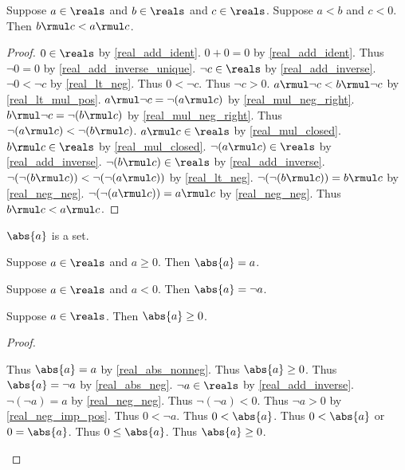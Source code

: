 \begin{theorem}\label{real_lt_mul_neg}
    Suppose $a\in\reals$ and $b\in\reals$ and $c\in\reals$.
    Suppose $a < b$ and $c < 0$.
    Then $b \rmul c < a \rmul c$.
\end{theorem}
\begin{proof}
    $0\in\reals$ by \cref{real_add_ident}.
    $0 + 0 = 0$ by \cref{real_add_ident}.
    Thus $\neg{0} = 0$ by \cref{real_add_inverse_unique}.
    $\neg{c}\in\reals$ by \cref{real_add_inverse}.
    $\neg{0} < \neg{c}$ by \cref{real_lt_neg}.
    Thus $0 < \neg{c}$.
    Thus $\neg{c} > 0$.
    $a \rmul \neg{c} < b \rmul \neg{c}$ by \cref{real_lt_mul_pos}.
    $a \rmul \neg{c} = \neg{(a \rmul c)}$ by \cref{real_mul_neg_right}.
    $b \rmul \neg{c} = \neg{(b \rmul c)}$ by \cref{real_mul_neg_right}.
    Thus $\neg{(a \rmul c)} < \neg{(b \rmul c)}$.
    $a \rmul c\in\reals$ by \cref{real_mul_closed}.
    $b \rmul c\in\reals$ by \cref{real_mul_closed}.
    $\neg{(a \rmul c)}\in\reals$ by \cref{real_add_inverse}.
    $\neg{(b \rmul c)}\in\reals$ by \cref{real_add_inverse}.
    $\neg{(\neg{(b \rmul c)})} < \neg{(\neg{(a \rmul c)})}$ by \cref{real_lt_neg}.
    $\neg{(\neg{(b \rmul c)})} = b \rmul c$ by \cref{real_neg_neg}.
    $\neg{(\neg{(a \rmul c)})} = a \rmul c$ by \cref{real_neg_neg}.
    Thus $b \rmul c < a \rmul c$.
\end{proof}

\begin{signature} \label{sig8}
    $\abs{a}$ is a set.
\end{signature}

\begin{axiom}\label{real_abs_nonneg}
    Suppose $a\in\reals$ and $a \geq 0$.
    Then $\abs{a} = a$.
\end{axiom}

\begin{axiom}\label{real_abs_neg}
    Suppose $a\in\reals$ and $a < 0$.
    Then $\abs{a} = \neg{a}$.
\end{axiom}

\begin{theorem}\label{real_abs_nonnegative}
    Suppose $a\in\reals$.
    Then $\abs{a} \geq 0$.
\end{theorem}
\begin{proof}
    \begin{byCase}
        Thus $\abs{a} = a$ by \cref{real_abs_nonneg}.
        Thus $\abs{a} \geq 0$.
        Thus $\abs{a} = \neg{a}$ by \cref{real_abs_neg}.
        $\neg{a}\in\reals$ by \cref{real_add_inverse}.
        $\neg{(\neg{a})} = a$ by \cref{real_neg_neg}.
        Thus $\neg{(\neg{a})} < 0$.
        Thus $\neg{a} > 0$ by \cref{real_neg_imp_pos}.
        Thus $0 < \neg{a}$.
        Thus $0 < \abs{a}$.
        Thus $0 < \abs{a}$ or $0 = \abs{a}$.
        Thus $0 \leq \abs{a}$.
        Thus $\abs{a} \geq 0$.
    \end{byCase}
\end{proof}

